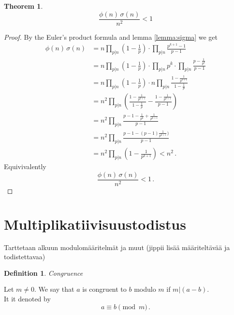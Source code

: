 \documentclass{article}
\theoremstyle{definition}
\newtheorem{definition}[subsection]{Definition}
\newtheorem{theorem}[subsection]{Theorem}
\begin{document}
\begin{theorem}
\label{thm:sigmafii}
\begin{equation*}
    \frac{\phi(n)\,\sigma(n)}{n^2}<1
\end{equation*}

\begin{proof}
By the Euler's product formula and lemma \ref{lemma:sigma} we get
\begin{align*}
    \phi(n)\,\sigma(n) & = n\prod_{p\vert n}\left(1-\frac{1}{p}\right) \cdot \prod_{p\vert n} \frac{p^{k+1}-1}{p-1}\\
    & = n\prod_{p\vert n}\left(1-\frac{1}{p}\right) \cdot \prod_{p\vert n} p^k \cdot \prod_{p\vert n} \frac{p-\frac{1}{p^k}}{p-1}\\
    & = n\prod_{p\vert n}\left(1-\frac{1}{p}\right) \cdot n \prod_{p\vert n}\frac{1-\frac{1}{p^{k+1}}}{1-\frac{1}{p}}\\
    & = n^2 \prod_{p\vert n} \left( \frac{1-\frac{1}{p^{k+1}}}{1-\frac{1}{p}} - \frac{1-\frac{1}{p^{k+1}}}{p-1}\right)\\
    & = n^2 \prod_{p\vert n} \frac{p-1-\frac{1}{p^k}+\frac{1}{p^{k+1}}}{p-1}\\
    & = n^2 \prod_{p\vert n} \frac{p-1-(p-1)\frac{1}{p^{k+1}})}{p-1}\\
    & = n^2 \prod_{p\vert n} \left(1-\frac{1}{p^{k+1}}\right) < n^2\,.
\end{align*}
Equivivalently
\begin{equation*}
    \frac{\phi(n)\,\sigma(n)}{n^2}<1\,.
\end{equation*}

\end{proof}
\end{theorem}

\section{Multiplikatiivisuustodistus}

Tarttetaan alkuun modulomääritelmät ja muut (jippii lisää määriteltävää ja todistettavaa)

\begin{definition}{\emph{Congruence}}

Let $m \not = 0$. We say that $a$ is congruent to $b$ modulo $m$ if $m\vert (a-b)$.\\It it denoted by
\begin{equation*}
    a \equiv b \pmod{m}\,.
\end{equation*}
\end{definition}
\end{document}
